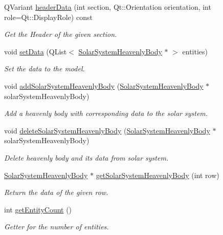 \begin{DoxyCompactItemize}
\-Q\-Variant \hyperlink{classSolarSystemHeavenlyBodyTableModel_a6794ee9665ef7c8ac88209791ca8c891}{header\-Data} (int section, \-Qt\-::\-Orientation orientation, int role=\-Qt\-::\-Display\-Role) const 
\begin{DoxyCompactList}\small\item\em \-Get the \-Header of the given section. \end{DoxyCompactList}\item 
void \hyperlink{classSolarSystemHeavenlyBodyTableModel_a5b3c766d6fc43ac20de2e7a74c5b0a83}{set\-Data} (\-Q\-List$<$ \hyperlink{classSolarSystemHeavenlyBody}{\-Solar\-System\-Heavenly\-Body} $\ast$ $>$ entities)
\begin{DoxyCompactList}\small\item\em \-Set the data to the model. \end{DoxyCompactList}\item 
void \hyperlink{classSolarSystemHeavenlyBodyTableModel_afd23f1ec90ad4a6a287c42a709b108e2}{add\-Solar\-System\-Heavenly\-Body} (\hyperlink{classSolarSystemHeavenlyBody}{\-Solar\-System\-Heavenly\-Body} $\ast$solar\-System\-Heavenly\-Body)
\begin{DoxyCompactList}\small\item\em \-Add a heavenly body with corresponding data to the solar system. \end{DoxyCompactList}\item 
void \hyperlink{classSolarSystemHeavenlyBodyTableModel_aa9d98386e9a50e133f9bee7853aa0465}{delete\-Solar\-System\-Heavenly\-Body} (\hyperlink{classSolarSystemHeavenlyBody}{\-Solar\-System\-Heavenly\-Body} $\ast$solar\-System\-Heavenly\-Body)
\begin{DoxyCompactList}\small\item\em \-Delete heavenly body and its data from solar system. \end{DoxyCompactList}\item 
\hyperlink{classSolarSystemHeavenlyBody}{\-Solar\-System\-Heavenly\-Body} $\ast$ \hyperlink{classSolarSystemHeavenlyBodyTableModel_a031620bee616572f2c7912e15e003679}{get\-Solar\-System\-Heavenly\-Body} (int row)
\begin{DoxyCompactList}\small\item\em \-Return the data of the given row. \end{DoxyCompactList}\item 
int \hyperlink{classSolarSystemHeavenlyBodyTableModel_aee4de0df36ed559c3b10441364f25f04}{get\-Entity\-Count} ()
\begin{DoxyCompactList}\small\item\em \-Getter for the number of entities. \end{DoxyCompactList}\item 

\end{DoxyCompactItemize}
